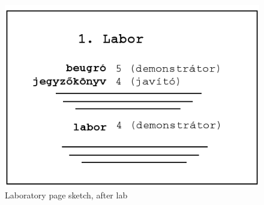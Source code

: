 \begin{figure}[!ht]
	\includegraphics[width=\textwidth]{figures/sketch8.png}
	\caption{Laboratory page sketch, after lab}
	\label{fig:sketch4}
\end{figure}

%

